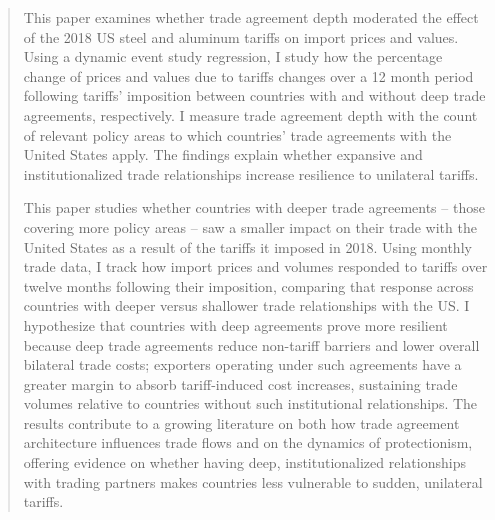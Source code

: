 \begin{abstract}
This paper examines whether trade agreement depth moderated the effect of the 2018 US steel and aluminum tariffs on import prices and values. Using a dynamic event study regression, I study how the percentage change of prices and values due to tariffs changes over a 12 month period following tariffs' imposition between countries with and without deep trade agreements, respectively. I measure trade agreement depth with the count of relevant policy areas to which countries' trade agreements with the United States apply. The findings explain whether expansive and institutionalized trade relationships increase resilience to unilateral tariffs.

This paper studies whether countries with deeper trade agreements – those covering more policy areas – saw a smaller impact on their trade with the United States as a result of the tariffs it imposed in 2018. Using monthly trade data, I track how import prices and volumes responded to tariffs over twelve months following their imposition, comparing that response across countries with deeper versus shallower trade relationships with the US. I hypothesize that countries with deep agreements prove more resilient because deep trade agreements reduce non-tariff barriers and lower overall bilateral trade costs; exporters operating under such agreements have a greater margin to absorb tariff-induced cost increases, sustaining trade volumes relative to countries without such institutional relationships. The results contribute to a growing literature on both how trade agreement architecture influences trade flows and on the dynamics of protectionism, offering evidence on whether having deep, institutionalized relationships with trading partners makes countries less vulnerable to sudden, unilateral tariffs.


\end{abstract}
